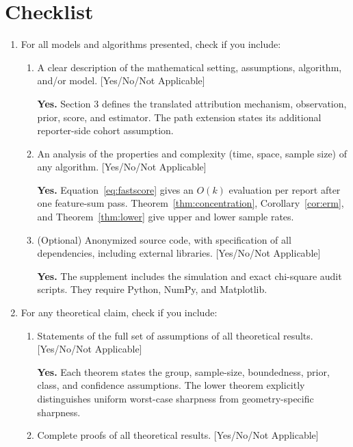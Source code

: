 \section*{Checklist}

\begingroup
\small
{}
\begin{enumerate}[leftmargin=*]

\item For all models and algorithms presented, check if you include:
  \begin{enumerate}
  \item A clear description of the mathematical setting, assumptions, algorithm, and/or model. [Yes/No/Not Applicable]

  \textbf{Yes.} Section 3 defines the translated attribution mechanism, observation, prior, score, and estimator. The path extension states its additional reporter-side cohort assumption.

  \item An analysis of the properties and complexity (time, space, sample size) of any algorithm. [Yes/No/Not Applicable]

  \textbf{Yes.} Equation~\eqref{eq:fastscore} gives an $O(k)$ evaluation per report after one feature-sum pass. Theorem~\ref{thm:concentration}, Corollary~\ref{cor:erm}, and Theorem~\ref{thm:lower} give upper and lower sample rates.

  \item (Optional) Anonymized source code, with specification of all dependencies, including external libraries. [Yes/No/Not Applicable]

  \textbf{Yes.} The supplement includes the simulation and exact chi-square audit scripts. They require Python, NumPy, and Matplotlib.
  \end{enumerate}

\item For any theoretical claim, check if you include:
  \begin{enumerate}
  \item Statements of the full set of assumptions of all theoretical results. [Yes/No/Not Applicable]

  \textbf{Yes.} Each theorem states the group, sample-size, boundedness, prior, class, and confidence assumptions. The lower theorem explicitly distinguishes uniform worst-case sharpness from geometry-specific sharpness.

  \item Complete proofs of all theoretical results. [Yes/No/Not Applicable]


\end{enumerate}
\end{enumerate}
